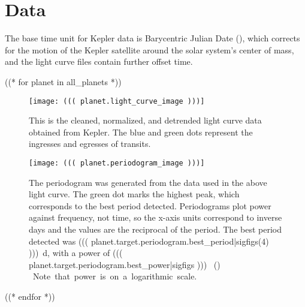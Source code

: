 \section{Data}

The base time unit for Kepler data is Barycentric Julian Date (\si{\bjd}), which corrects for the motion of the Kepler satellite around
the solar system's center of mass, and the light curve files contain further offset time. \autocite{keplerManual}



((* for planet in all_planets *))

\begin{figure}[H]
    \centering
    \texttt{[image: ((( planet.light\_curve\_image )))]}
    \caption{This is the cleaned, normalized, and detrended light curve data
    obtained from Kepler. The blue and green dots represent the ingresses and
    egresses of transits.}
\end{figure}

\begin{figure}[H]
    \centering
    \texttt{[image: ((( planet.periodogram\_image )))]}
    \caption{The periodogram was generated from the data used in the above light curve. The green dot marks the highest peak, which corresponds to
    the best period detected. Periodograms plot power against frequency, not time, so the x-axis units correspond to inverse days and the values
    are the reciprocal of the period. The best period detected was \SI{((( planet.target.periodogram.best_period|sigfigs(4) )))}{\day}, with a power of
    \SI{((( planet.target.periodogram.best_power|sigfigs )))}{ (\electron\per\second)   }.
    Note that power is on a logarithmic scale.}
\end{figure}

((* endfor *))
